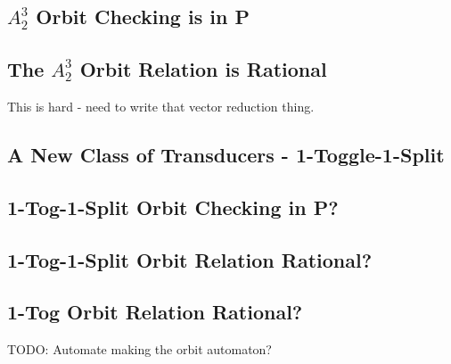 \documentclass{article}
\newcommand{\0}{\underline{0}}
\newcommand{\1}{\underline{1}}
\newcommand{\2}{\underline{2}}
\begin{document}
\subsection*{$A^3_2$ Orbit Checking is in P}

\subsection*{The $A^3_2$ Orbit Relation is Rational}
This is hard - need to write that vector reduction thing.

\subsection*{A New Class of Transducers - 1-Toggle-1-Split}

\subsection*{1-Tog-1-Split Orbit Checking in P?}

\subsection*{1-Tog-1-Split Orbit Relation Rational?}

\subsection*{1-Tog Orbit Relation Rational?}

TODO: Automate making the orbit automaton?
\end{document}
